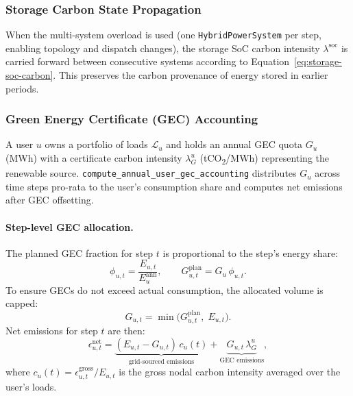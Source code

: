 \subsubsection{Storage Carbon State Propagation}

When the multi-system overload is used (one \texttt{HybridPowerSystem}
per step, enabling topology and dispatch changes), the storage SoC
carbon intensity $\lambda^{\text{soc}}$ is carried forward between
consecutive systems according to Equation~\eqref{eq:storage-soc-carbon}.
This preserves the carbon provenance of energy stored in earlier periods.

\subsubsection{Green Energy Certificate (GEC) Accounting}
\label{sec:gec}

A user $u$ owns a portfolio of loads $\mathcal{L}_u$ and holds an annual
GEC quota $G_u$ (MWh) with a certificate carbon intensity $\lambda_G^u$
(tCO\textsubscript{2}/MWh) representing the renewable source.
\texttt{compute\_annual\_user\_gec\_accounting} distributes $G_u$ across
time steps pro-rata to the user's consumption share and computes net
emissions after GEC offsetting.

\paragraph{Step-level GEC allocation.}
The planned GEC fraction for step $t$ is proportional to the step's
energy share:
\begin{equation}
  \phi_{u,t} = \frac{E_{u,t}}{E_u^{\text{ann}}}, \qquad
  G_{u,t}^{\text{plan}} = G_u\,\phi_{u,t}.
\end{equation}
To ensure GECs do not exceed actual consumption, the allocated volume is
capped:
\begin{equation}
  G_{u,t} = \min\!\bigl(G_{u,t}^{\text{plan}},\; E_{u,t}\bigr).
  \label{eq:gec-allocated}
\end{equation}
Net emissions for step $t$ are then:
\begin{equation}
  \epsilon_{u,t}^{\text{net}} =
    \underbrace{(E_{u,t} - G_{u,t})\,c_u(t)}_{\text{grid-sourced emissions}}
    + \underbrace{G_{u,t}\,\lambda_G^u}_{\text{GEC emissions}},
  \label{eq:gec-net}
\end{equation}
where $c_u(t) = \epsilon_{u,t}^{\text{gross}} / E_{u,t}$ is the gross
nodal carbon intensity averaged over the user's loads.

